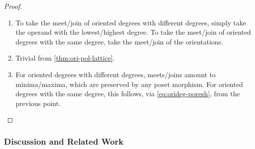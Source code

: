 \documentclass[a4paper]{memoir}
\begin{document}
\begin{proof}
	\begin{enumerate}
		\item To take the meet/join of oriented degrees with different degrees, simply take the operand with the lowest/highest degree. To take the meet/join of oriented degrees with the same degree, take the meet/join of the orientations.
		\item Trivial from \cref{thm:ori-pol-lattice}.
		\item For oriented degrees with different degrees, meets/joins amount to minima/maxima, which are preserved by any poset morphism. For oriented degrees with the same degree, this follows, via \cref{eq:orideg-poresh}, from the previous point. \qedhere
	\end{enumerate}
\end{proof}

\subsubsection{Discussion and Related Work}
\end{document}
